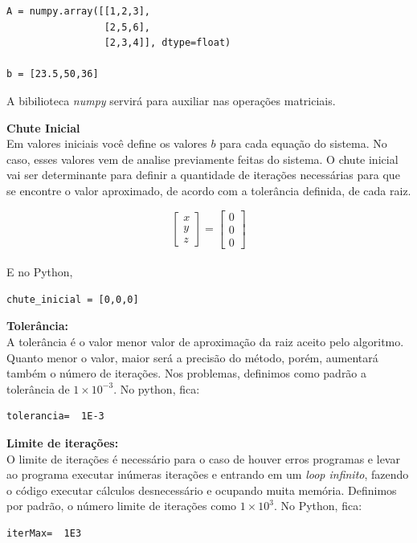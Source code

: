 \documentclass[
	12pt,				%
	openright,			%
	twoside,			%
	a4paper,			%
	english,			%
	french,				%
	spanish,			%
	brazil				%
	]{abntex2_new}
\begin{document}
\begin{alineas}
{\begin{lstlisting}
A = numpy.array([[1,2,3],
              	 [2,5,6],
              	 [2,3,4]], dtype=float)

b = [23.5,50,36]
\end{lstlisting}
A bibilioteca \textit{numpy} servirá para auxiliar nas operações matriciais.
}

\item{\textbf{Chute Inicial}\\
	Em valores iniciais você define os valores $b$ para cada
	equação do sistema. No caso, esses valores vem de analise previamente feitas do sistema. O chute inicial
	vai ser determinante para definir a quantidade de 
	iterações necessárias para que se encontre o valor
	aproximado, de acordo com a tolerância definida, de 
	cada raiz.
	
	$$  \begin{bmatrix}
	x \\
	y \\
	z 
	\end{bmatrix} =
	\begin{bmatrix}
	0 \\
	0 \\
	0
	\end{bmatrix}
	$$\\
	
	E no Python,
	
	\begin{lstlisting}
chute_inicial = [0,0,0]\end{lstlisting}
	
	
}


	
	\item{\textbf{Tolerância:}\\
	A tolerância é o valor menor valor de aproximação da
	raiz aceito pelo algoritmo. Quanto menor o valor, maior
	será a precisão do método, porém, aumentará também o 
	número de iterações. Nos problemas, definimos como padrão
	a tolerância de $1\times10^{-3}$. No python, fica:
		\begin{lstlisting}
tolerancia=  1E-3\end{lstlisting}
}

\item{\textbf{Limite de iterações:}\\
	O limite de iterações é necessário para o caso de houver
	erros programas e levar ao programa executar inúmeras iterações
	e entrando em um \textit{loop infinito}, fazendo o código executar cálculos
	desnecessário e ocupando muita memória. Definimos por padrão, o número limite
	de iterações como $1\times 10^{3}$. No Python, fica:
		\begin{lstlisting}
iterMax=  1E3\end{lstlisting}
	
}
\end{alineas}
\end{document}
